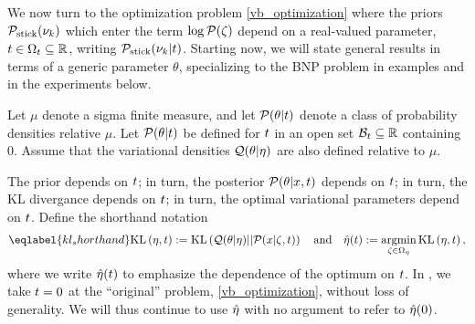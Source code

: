 We now turn to the optimization problem \eqref{vb_optimization} where the priors
$\mathcal{P}_{\mathrm{stick}}(\nu_{k})$ which enter the term $\log \mathcal{P}(\zeta)$ depend on a real-valued
parameter, $t \in \Omega_{t} \subseteq \mathbb{R}$, writing $\mathcal{P}_{\mathrm{stick}}(\nu_{k} \vert
t)$.  Starting now, we will state general results in terms of a generic
parameter $\theta$, specializing to the BNP problem in examples and in the
experiments below.

\begin{defn}
%
Let $\mu$ denote a sigma finite measure, and let $\mathcal{P}(\theta \vert t)$ denote a
class of probability densities relative $\mu$.  Let $\mathcal{P}(\theta \vert t)$ be
defined for $t$ in an open set $\mathcal{B}_t \subseteq \mathbb{R}$ containing $0$.
Assume that the variational densities $\mathcal{Q}(\theta \vert \eta)$ are also defined
relative to $\mu$.
%
\end{defn}

The prior depends on $t$; in turn, the posterior $\mathcal{P}(\theta \vert x, t)$
depends on $t$; in turn, the KL divergance depends on $t$; in turn, the
optimal variational parameters depend on $t$.  Define the shorthand notation
%
\begin{align}\eqlabel{kl_shorthand}
%
\KL{\eta, \t} := \KL{\q(\theta \vert \eta) || \p(\x \vert \zeta, \t)}
\mathand
\etaopt(\t) := \argmin_{\zeta \in \etadom} \KL{\eta, \t},
%
\end{align}
%
where we write $\hat\eta(t)$ to emphasize the dependence of the optimum on $t$.
In , we take $t = 0$ at the ``original'' problem,
\eqref{vb_optimization}, without loss of generality.  We will thus continue to
use $\hat\eta$ with no argument to refer to $\hat\eta(0)$.


